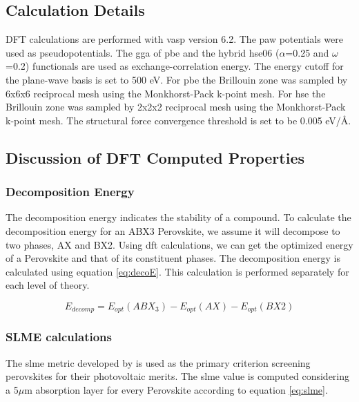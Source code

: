 \documentclass[twoside, twocolumn, 9pt, draft]{article}
\begin{document}
\subsection*{Calculation Details}
\label{sec:org57234d7}
DFT calculations are performed with \gls{vasp} version 6.2. The \acrlong{paw} potentials were used as pseudopotentials. The
\acrlong{gga} of \acrshort{pbe} and the hybrid \acrshort{hse}06
(\(\alpha\)=0.25 and \(\omega\)=0.2) functionals are used as
exchange-correlation energy. The energy cutoff for the plane-wave
basis is set to 500 eV. For \acrshort{pbe} the Brillouin zone was sampled by
6x6x6 reciprocal mesh using the Monkhorst-Pack k-point mesh. For \acrshort{hse}
the Brillouin zone was sampled by 2x2x2 reciprocal mesh using the
Monkhorst-Pack k-point mesh. The structural force convergence
threshold is set to be 0.005 eV/\AA{}.

\subsection*{Discussion of DFT Computed Properties}
\label{sec:org7a2b2e8}
\subsubsection*{Decomposition Energy}
\label{sec:org11cd63c}
The decomposition energy indicates the stability of a compound. To
calculate the decomposition energy for an ABX3 Perovskite, we assume
it will decompose to two phases, AX and BX2. Using \acrshort{dft} calculations,
we can get the optimized energy of a Perovskite and that of its
constituent phases. The decomposition energy is calculated using
equation \eqref{eq:decoE}. This calculation is performed separately for
each level of theory.

\begin{equation}\label{eq:decoE}
E_{decomp} = E_{opt}(ABX_3) - E_{opt}(AX) - E_{opt}(BX2)
\end{equation}

\subsubsection*{SLME calculations}
\label{sec:org21fb725}
The \gls{slme} metric developed by \citet{yu-2012-ident-poten} is used as the
primary criterion screening perovskites for their photovoltaic
merits. The \gls{slme} value is computed considering a 5\(\mu\)m absorption
layer for every Perovskite according to equation \eqref{eq:slme}.
\end{document}

